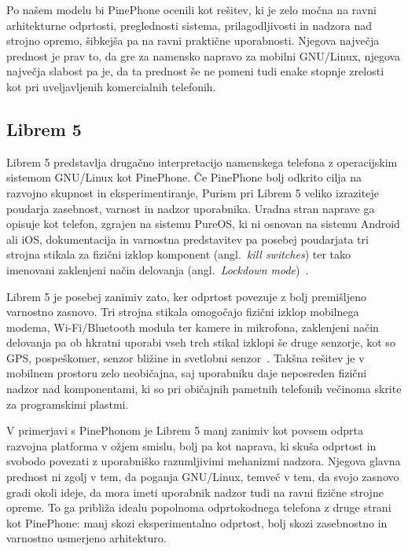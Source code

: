 \documentclass[a4paper,12pt,openright]{book}
\begin{document}
Po našem modelu bi PinePhone ocenili kot rešitev, ki je zelo močna na ravni arhitekturne odprtosti, preglednosti sistema, prilagodljivosti in nadzora nad strojno opremo, šibkejša pa na ravni praktične uporabnosti.
Njegova največja prednost je prav to, da gre za namensko napravo za mobilni GNU/Linux, njegova največja slabost pa je, da ta prednost še ne pomeni tudi enake stopnje zrelosti kot pri uveljavljenih komercialnih telefonih.

\subsection{Librem 5}

Librem 5 predstavlja drugačno interpretacijo namenskega telefona z operacijskim sistemom GNU/Linux kot PinePhone.
Če PinePhone bolj odkrito cilja na razvojno skupnost in eksperimentiranje, Purism pri Librem 5 veliko izraziteje poudarja zasebnost, varnost in nadzor uporabnika.
Uradna stran naprave ga opisuje kot telefon, zgrajen na sistemu PureOS, ki ni osnovan na sistemu Android ali iOS, dokumentacija in varnostna predstavitev pa posebej poudarjata tri strojna stikala za fizični izklop komponent (angl.~\textit{kill switches}) ter tako imenovani zaklenjeni način delovanja (angl.~\textit{Lockdown mode})~\cite{purism_librem5_product,purism_security,purism_lockdown_mode}.

Librem 5 je posebej zanimiv zato, ker odprtost povezuje z bolj premišljeno varnostno zasnovo.
Tri strojna stikala omogočajo fizični izklop mobilnega modema, Wi-Fi/Bluetooth modula ter kamere in mikrofona, zaklenjeni način delovanja pa ob hkratni uporabi vseh treh stikal izklopi še druge senzorje, kot so GPS, pospeškomer, senzor bližine in svetlobni senzor~\cite{purism_security,purism_lockdown_mode}.
Takšna rešitev je v mobilnem prostoru zelo neobičajna, saj uporabniku daje neposreden fizični nadzor nad komponentami, ki so pri običajnih pametnih telefonih večinoma skrite za programskimi plastmi.

V primerjavi s PinePhonom je Librem 5 manj zanimiv kot povsem odprta razvojna platforma v ožjem smislu, bolj pa kot naprava, ki skuša odprtost in svobodo povezati z uporabniško razumljivimi mehanizmi nadzora.
Njegova glavna prednost ni zgolj v tem, da poganja GNU/Linux, temveč v tem, da svojo zasnovo gradi okoli ideje, da mora imeti uporabnik nadzor tudi na ravni fizične strojne opreme.
To ga približa idealu popolnoma odprtokodnega telefona z druge strani kot PinePhone: manj skozi eksperimentalno odprtost, bolj skozi zasebnostno in varnostno usmerjeno arhitekturo.
\end{document}
